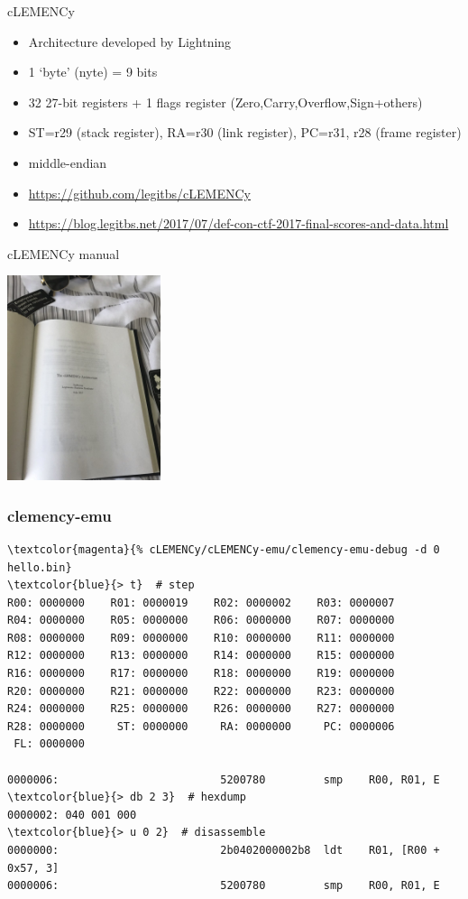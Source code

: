 \documentclass{beamer}
\begin{document}
\begin{frame}{cLEMENCy}
  \begin{itemize}
  \item Architecture developed by Lightning
  \item 1 `byte' ({\color{blue}nyte}) = \alert{9 bits}
  \item 32 \alert{27-bit} registers + 1 flags register (Zero,Carry,Overflow,Sign+others)
  \item ST=r29 (stack register), RA=r30 (link register), PC=r31, r28 (frame register)
  \item \alert{middle-endian}
  \item \url{https://github.com/legitbs/cLEMENCy}
  \item \url{https://blog.legitbs.net/2017/07/def-con-ctf-2017-final-scores-and-data.html}
  \end{itemize}
\end{frame}

\begin{frame}{cLEMENCy manual}
  \begin{center}
    \includegraphics[height=6cm]{manual.jpg}
  \end{center}
\end{frame}

\begin{frame}[fragile]
  \frametitle{clemency-emu}
  \scriptsize
  \begin{Verbatim}[commandchars=\\\{\}]
\textcolor{magenta}{% cLEMENCy/cLEMENCy-emu/clemency-emu-debug -d 0 hello.bin}
\textcolor{blue}{> t}  # step
R00: 0000000    R01: 0000019    R02: 0000002    R03: 0000007
R04: 0000000    R05: 0000000    R06: 0000000    R07: 0000000
R08: 0000000    R09: 0000000    R10: 0000000    R11: 0000000
R12: 0000000    R13: 0000000    R14: 0000000    R15: 0000000
R16: 0000000    R17: 0000000    R18: 0000000    R19: 0000000
R20: 0000000    R21: 0000000    R22: 0000000    R23: 0000000
R24: 0000000    R25: 0000000    R26: 0000000    R27: 0000000
R28: 0000000     ST: 0000000     RA: 0000000     PC: 0000006
 FL: 0000000

0000006:                         5200780         smp    R00, R01, E
\textcolor{blue}{> db 2 3}  # hexdump
0000002: 040 001 000
\textcolor{blue}{> u 0 2}  # disassemble
0000000:                         2b0402000002b8  ldt    R01, [R00 + 0x57, 3]
0000006:                         5200780         smp    R00, R01, E
  \end{Verbatim}
\end{frame}
\end{document}
